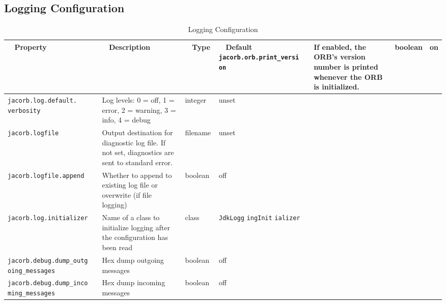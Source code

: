 \subsection{Logging Configuration}
\begin{small}
\begin{longtable}{|p{5cm}|p{7.5cm}|p{1.5cm}|p{1.5cm}|}
\caption{Logging Configuration}\\
\hline
~ \hfill \textbf {Property} \hfill ~ & ~ \hfill \textbf {Description}
\hfill ~ & ~ \hfill \textbf {Type} \hfill ~ & ~ \hfill
\textbf{Default} ~ \endhead
\hline
\verb"jacorb.orb.print_versi"
\verb"on" & If enabled, the ORB's version number is printed whenever
the ORB is initialized. & boolean & on \\
\hline
\verb"jacorb.log.default."
\verb"verbosity" & Log levels: 0 = off, 1 =
error, 2 = warning, 3 = info, 4 = debug & integer & unset \\
\hline
\verb"jacorb.logfile" & Output destination for diagnostic log file. If
not set, diagnostics are sent to standard error.& filename & unset \\
\hline
\verb"jacorb.logfile.append" & Whether to append to
existing log file or overwrite (if file logging) & boolean & off \\
\hline
\verb"jacorb.log.initializer" & Name of a class to initialize logging
after the configuration has been read & class &
\verb"JdkLogg"
\verb"ingInit"
\verb"ializer" \\
\hline
\verb"jacorb.debug.dump_outg"
\verb"oing_messages" & Hex dump outgoing messages & boolean & off \\
\hline
\verb"jacorb.debug.dump_inco"
\verb"ming_messages" & Hex dump incoming messages & boolean & off \\
\hline
\end{longtable}
\end{small}


